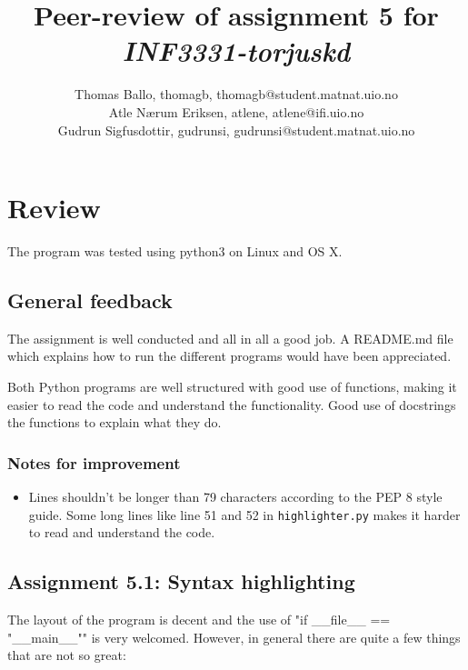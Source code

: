 \documentclass[a4paper]{article}
\title{Peer-review of assignment 5 for \textit{INF3331-torjuskd}}
\author{Thomas Ballo, thomagb, {thomagb@student.matnat.uio.no} \\
 		Atle Nærum Eriksen, atlene, {atlene@ifi.uio.no} \\
		Gudrun Sigfusdottir, gudrunsi, {gudrunsi@student.matnat.uio.no}}
\begin{document}
\maketitle

\section{Review}\label{sec:review}

The program was tested using python3 on Linux and OS X.

\subsection*{General feedback}
The assignment is well conducted and all in all a good job. A README.md file which explains how to run the different programs would have been appreciated.

Both Python programs are well structured with good use of functions, making it easier to read the code and understand the functionality. Good use of docstrings the functions to explain what they do.

\subsubsection*{Notes for improvement}
\begin{itemize}
	\item Lines shouldn't be longer than 79 characters according to the PEP 8 style guide. Some long lines like line 51 and 52 in \texttt{highlighter.py} makes it harder to read and understand the code.
\end{itemize}

\subsection*{Assignment 5.1: Syntax highlighting}
The layout of the program is decent and the use of "if \_\_file\_\_ == "\_\_main\_\_"" is very welcomed. However, in general there are quite a few things that are not so great:
\end{document}
